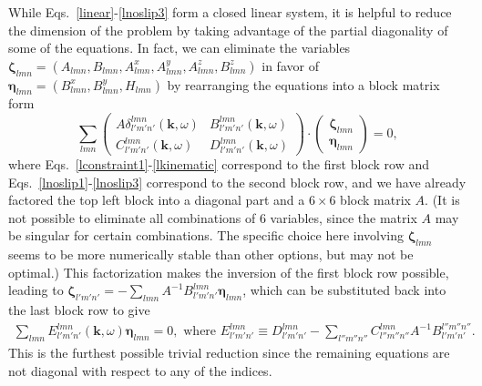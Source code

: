 \documentclass[aps,pre,amsmath,amssymb,floatfix,onecolumn,notitlepage,10pt]{revtex4-1}
\begin{document}
While Eqs.~\eqref{linear}-\eqref{lnoslip3} form a closed linear system, it is helpful to reduce the dimension of the problem by taking advantage of the partial diagonality of some of the equations.  In fact, we can eliminate the variables $\bm{\zeta}_{lmn}=(A_{lmn},B_{lmn},A^x_{lmn},A^y_{lmn},A^z_{lmn},B^z_{lmn})$ in favor of $\bm{\eta}_{lmn}=(B^x_{lmn},B^y_{lmn},H_{lmn})$ by rearranging the equations into a block matrix form
\begin{equation}
\sum_{lmn} \begin{pmatrix} A\delta^{lmn}_{l'm'n'}(\mathbf{k},\omega) & B^{lmn}_{l'm'n'}(\mathbf{k},\omega) \\ C^{lmn}_{l'm'n'}(\mathbf{k},\omega) & D^{lmn}_{l'm'n'}(\mathbf{k},\omega) \end{pmatrix} \cdot \begin{pmatrix} \bm{\zeta}_{lmn} \\ \bm{\eta}_{lmn}\end{pmatrix} = 0,
\end{equation}
where Eqs.~\eqref{lconstraint1}-\eqref{lkinematic} correspond to the first block row and Eqs.~\eqref{lnoslip1}-\eqref{lnoslip3} correspond to the second block row, and we have already factored the top left block into a diagonal part and a $6\times 6$ block matrix $A$.  (It is not possible to eliminate all combinations of $6$ variables, since the matrix $A$ may be singular for certain combinations. The specific choice here involving $\bm{\zeta}_{lmn}$ seems to be more numerically stable than other options, but may not be optimal.) This factorization makes the inversion of the first block row possible, leading to $\bm{\zeta}_{l'm'n'} =- \sum_{lmn} A^{-1} B^{lmn}_{l'm'n'}\bm{\eta}_{lmn}$, which can be substituted back into the last block row to give
\begin{align}
\sum_{lmn} E_{l'm'n'}^{lmn}(\mathbf{k},\omega) \bm{\eta}_{lmn} = 0, \text{ where } E_{l'm'n'}^{lmn} \equiv D^{lmn}_{l'm'n'} - \sum_{l''m''n''} C^{lmn}_{l''m''n''}A^{-1}B^{l''m''n''}_{l'm'n'}. \label{neigen}
\end{align}
This is the furthest possible trivial reduction since the remaining equations are not diagonal with respect to any of the indices. 
\end{document}
